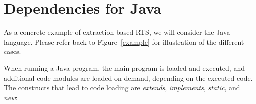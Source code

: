 {%



\section{Dependencies for Java}
\label{JavaDeps}

As a concrete example of extraction-based RTS, we will consider the Java language. Please refer back to Figure~\ref{example} for illustration of the different cases.

When running a Java program, the main program is loaded and executed, and additional code modules are loaded on demand, depending on the executed code. The constructs that lead to code loading are \emph{extends}, \emph{implements}, \emph{static}, and \emph{new}:

}
